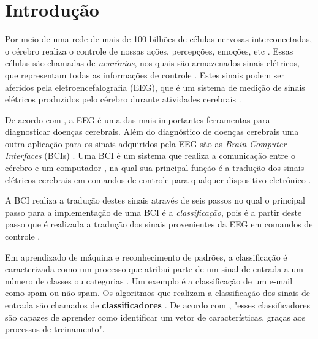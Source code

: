 \chapter[Introdução]{Introdução}

Por meio de uma rede de mais de 100 bilhões de células nervosas interconectadas, o cérebro realiza o controle de nossas ações, percepções, emoções, etc \cite{KANDEL}. Essas células são chamadas de \textit{neurônios}, nos quais são armazenados sinais elétricos, que representam todas as informações de controle \cite{Siulybook}. Estes sinais podem ser aferidos pela eletroencefalografia (EEG), que é um sistema de medição de sinais elétricos produzidos pelo cérebro durante atividades cerebrais \cite{F.Lotte}. 

De acordo com \cite{SIULYDissertacao}, a EEG é uma das mais importantes ferramentas para diagnosticar doenças cerebrais. Além do diagnóstico de doenças cerebrais uma outra aplicação para os sinais adquiridos pela EEG são as \textit{Brain Computer Interfaces} (BCIs) \cite{F.Lotte}. Uma BCI é um
sistema que realiza a comunicação entre o cérebro e um computador \cite{Siulybook}, na qual sua principal função é a tradução dos sinais elétricos cerebrais em comandos de controle para qualquer dispositivo eletrônico \cite{Siulybook}.

A BCI realiza a tradução destes sinais através de seis passos no qual o principal passo para a implementação de uma
BCI é a \textit{classificação}, pois é a partir deste passo que é realizada a tradução dos sinais provenientes da EEG em comandos de controle \cite{MasonAndBirch}.

Em aprendizado de máquina e reconhecimento de padrões, a classificação é caracterizada como um processo que atribui parte de um sinal de entrada a um número de classes ou categorias \cite{brunelli2009template}. Um exemplo é a classificação de um e-mail como spam ou não-spam. Os algoritmos que realizam a classificação dos sinais de entrada são chamados de \textbf{classificadores} \cite{Siulybook}. De acordo com \cite{lottephd}, "esses classificadores são capazes de aprender como identificar um vetor de características, graças aos processos de treinamento".

